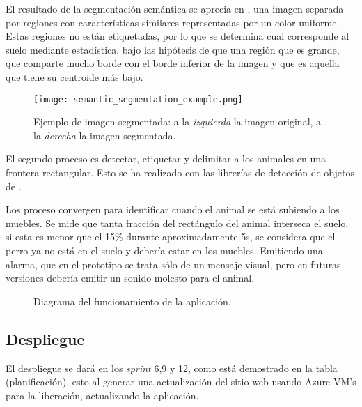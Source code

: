 El resultado de la segmentación semántica se aprecia en , una imagen separada por regiones con características similares representadas por un color uniforme. Estas regiones no están etiquetadas, por lo que se determina cual corresponde al suelo mediante estadística, bajo las hipótesis de que una región que es grande, que comparte mucho borde con el borde inferior de la imagen  y que es aquella que tiene su centroide más bajo. 

\begin{figure}
    \centering
    \caption[Ejemplo de segmentación.]{Ejemplo de imagen segmentada: a la \textit{izquierda} la imagen original, a la \textit{derecha} la imagen segmentada.} 
    \label{fig:segmentacion}
    \texttt{[image: semantic\_segmentation\_example.png]}
\end{figure}

El segundo proceso es detectar, etiquetar y delimitar a los animales en una frontera rectangular. Esto se ha realizado con las librerías de detección de objetos de \textcite{tensorflow2022}.


Los proceso convergen para identificar cuando el animal se está subiendo a los muebles. Se mide que tanta fracción del rectángulo del animal interseca el suelo, si esta es menor que el 15\% durante aproximadamente 5s, se considera que el perro ya no está en el suelo y debería estar en los muebles. Emitiendo una alarma, que en el prototipo se trata sólo de un mensaje visual, pero en futuras versiones debería emitir un sonido molesto para el animal.


\begin{figure}
    \centering
    \caption[Diagrama del funcionamiento de la aplicación.]{Diagrama del funcionamiento de la aplicación.}
    \label{fig:funcionamiento}
    
\end{figure}


\subsection{Despliegue}

El despliegue se dará en los \textit{sprint} 6,9 y 12, como está demostrado en la tabla (planificación), esto al generar una actualización del sitio web usando Azure VM's para la liberación, actualizando la aplicación. 

